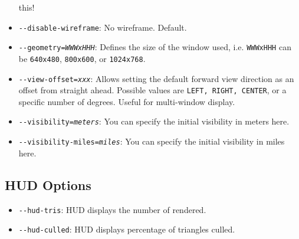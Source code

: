 \begin{itemize}
this!
\item{\texttt{-$ $-disable-wireframe}}: No wireframe. Default.
\item{\texttt{-$ $-geometry={\it WWWxHHH}}}: Defines the size of the window used, i.e.
\texttt{WWWxHHH} can be \texttt{640x480}, \texttt{800x600}, or
\texttt{1024x768}.
\item{\texttt{-$ $-view-offset={\it xxx}}}: Allows setting the default forward view direction as an offset from straight
ahead. Possible values are \texttt{LEFT, RIGHT, CENTER}, or a specific number of degrees.
Useful for multi-window display.
\item{\texttt{-$ $-visibility={\it meters}}}: You can specify the initial visibility in meters here.
\item{\texttt{-$ $-visibility-miles={\it miles}}}: You can specify the initial visibility in miles here.
\end{itemize}

\subsection{HUD Options}
\begin{itemize}
\item{\texttt{-$ $-hud-tris}}: HUD displays the number of  rendered.
\item{\texttt{-$ $-hud-culled}}: HUD displays percentage of triangles culled.
\end{itemize}
